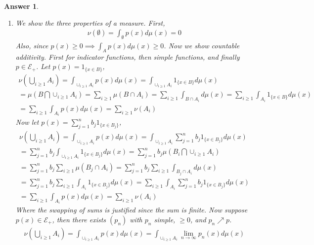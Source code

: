 \documentclass[12pt]{article}
\theoremstyle{colon}
\newtheorem*{answer}{Answer}
\begin{document}
\begin{answer}
  \leavevmode
  \begin{enumerate}[label=\alph*)]
    \item We show the three properties of a measure. First,
      \begin{gather*}
        \nu(\emptyset) = \int_\emptyset p(x) d\mu(x) = 0
      \end{gather*}
      Also, since $p(x) \geq 0 \implies \int_A p(x) d\mu(x) \geq 0$. Now we show countable additivity. First for indicator functions, then simple functions, and finally $p \in \mathcal{E}_+$. Let $p(x) = 1_{\{ x \in B \}}$,
      \begin{gather*}
        \nu \left( \bigcup_{i \geq 1} A_i \right) = \int_{\cup_{i \geq 1} A_i} p(x) d\mu(x) = \int_{\cup_{i \geq 1} A_i} 1_{\{ x \in B \}} d\mu(x) \\
        = \mu(B \bigcap \cup_{i \geq 1} A_i) = \sum_{i \geq 1} \mu(B \cap A_i) = \sum_{i \geq 1} \int_{B \cap A_i} d\mu(x) = \sum_{i \geq 1} \int_{A_i} 1_{\{ x \in B \}} d\mu(x) \\
        = \sum_{i \geq 1} \int_{A_i} p(x) d\mu(x) = \sum_{i \geq 1} \nu(A_i)
      \end{gather*}
      Now let $p(x) = \sum_{j = 1}^n b_j 1_{\{ x \in B_j \}}$,
      \begin{gather*}
        \nu \left( \bigcup_{i \geq 1} A_i \right) = \int_{\cup_{i \geq 1} A_i} p(x) d\mu(x) = \int_{\cup_{i \geq 1} A_i} \sum_{j = 1}^n b_j 1_{\{ x \in B_j \}} d\mu(x) \\
        = \sum_{j = 1}^n b_j \int_{\cup_{i \geq 1} A_i} 1_{\{ x \in B_j \}} d\mu(x) = \sum_{j = 1}^n b_j \mu(B_i \bigcap \cup_{i \geq 1} A_i) \\
        = \sum_{j = 1}^n b_j \sum_{i \geq 1} \mu(B_j \cap A_i) = \sum_{j = 1}^n b_j \sum_{i \geq 1} \int_{B_j \cap A_i} d\mu(x) \\
        = \sum_{j = 1}^n b_j \sum_{i \geq 1} \int_{A_i} 1_{\{ x \in B_j \}} d\mu(x) = \sum_{i \geq 1} \int_{A_i} \sum_{j = 1}^n b_j 1_{\{ x \in B_j \}} d\mu(x) \\
        = \sum_{i \geq 1} \int_{A_i} p(x) d\mu(x) = \sum_{i \geq 1} \nu(A_i)
      \end{gather*}
      Where the swapping of sums is justified since the sum is finite.
      Now suppose $p(x) \in \mathcal{E}_+$, then there exists $(p_n)$ with $p_n$ simple, $\geq 0$, and $p_n \nearrow p$.
      \begin{gather*}
        \nu \left( \bigcup_{i \geq 1} A_i \right) = \int_{\cup_{i \geq 1} A_i} p(x) d\mu(x) = \int_{\cup_{i \geq 1} A_i} \lim_{n \rightarrow \infty} p_n(x) d\mu(x) \\

\end{gather*}
\end{enumerate}
\end{answer}
\end{document}
